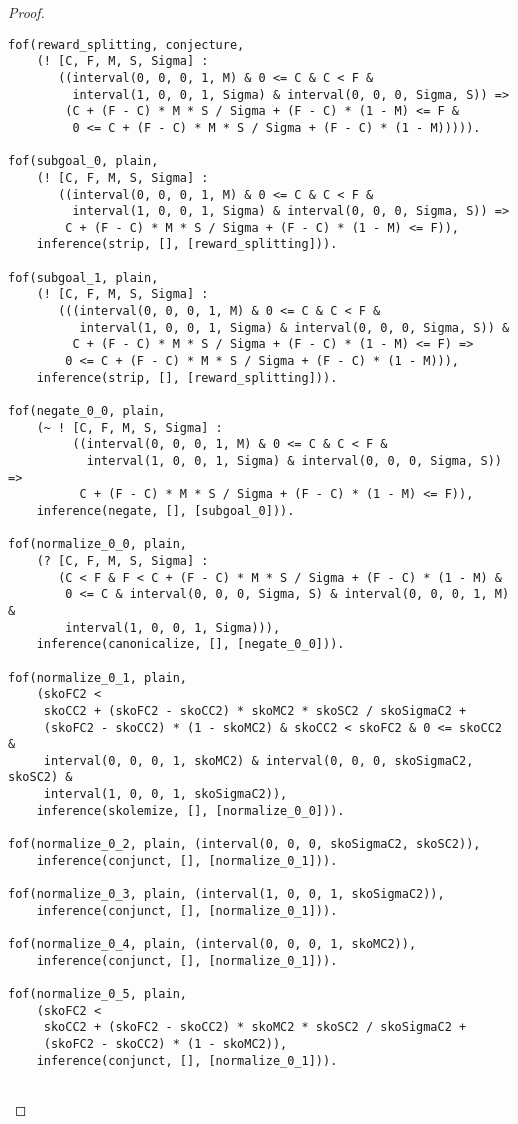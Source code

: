 \begin{proof}
\begin{verbatim}
fof(reward_splitting, conjecture,
    (! [C, F, M, S, Sigma] :
       ((interval(0, 0, 0, 1, M) & 0 <= C & C < F &
         interval(1, 0, 0, 1, Sigma) & interval(0, 0, 0, Sigma, S)) =>
        (C + (F - C) * M * S / Sigma + (F - C) * (1 - M) <= F &
         0 <= C + (F - C) * M * S / Sigma + (F - C) * (1 - M))))).

fof(subgoal_0, plain,
    (! [C, F, M, S, Sigma] :
       ((interval(0, 0, 0, 1, M) & 0 <= C & C < F &
         interval(1, 0, 0, 1, Sigma) & interval(0, 0, 0, Sigma, S)) =>
        C + (F - C) * M * S / Sigma + (F - C) * (1 - M) <= F)),
    inference(strip, [], [reward_splitting])).

fof(subgoal_1, plain,
    (! [C, F, M, S, Sigma] :
       (((interval(0, 0, 0, 1, M) & 0 <= C & C < F &
          interval(1, 0, 0, 1, Sigma) & interval(0, 0, 0, Sigma, S)) &
         C + (F - C) * M * S / Sigma + (F - C) * (1 - M) <= F) =>
        0 <= C + (F - C) * M * S / Sigma + (F - C) * (1 - M))),
    inference(strip, [], [reward_splitting])).

fof(negate_0_0, plain,
    (~ ! [C, F, M, S, Sigma] :
         ((interval(0, 0, 0, 1, M) & 0 <= C & C < F &
           interval(1, 0, 0, 1, Sigma) & interval(0, 0, 0, Sigma, S)) =>
          C + (F - C) * M * S / Sigma + (F - C) * (1 - M) <= F)),
    inference(negate, [], [subgoal_0])).

fof(normalize_0_0, plain,
    (? [C, F, M, S, Sigma] :
       (C < F & F < C + (F - C) * M * S / Sigma + (F - C) * (1 - M) &
        0 <= C & interval(0, 0, 0, Sigma, S) & interval(0, 0, 0, 1, M) &
        interval(1, 0, 0, 1, Sigma))),
    inference(canonicalize, [], [negate_0_0])).

fof(normalize_0_1, plain,
    (skoFC2 <
     skoCC2 + (skoFC2 - skoCC2) * skoMC2 * skoSC2 / skoSigmaC2 +
     (skoFC2 - skoCC2) * (1 - skoMC2) & skoCC2 < skoFC2 & 0 <= skoCC2 &
     interval(0, 0, 0, 1, skoMC2) & interval(0, 0, 0, skoSigmaC2, skoSC2) &
     interval(1, 0, 0, 1, skoSigmaC2)),
    inference(skolemize, [], [normalize_0_0])).

fof(normalize_0_2, plain, (interval(0, 0, 0, skoSigmaC2, skoSC2)),
    inference(conjunct, [], [normalize_0_1])).

fof(normalize_0_3, plain, (interval(1, 0, 0, 1, skoSigmaC2)),
    inference(conjunct, [], [normalize_0_1])).

fof(normalize_0_4, plain, (interval(0, 0, 0, 1, skoMC2)),
    inference(conjunct, [], [normalize_0_1])).

fof(normalize_0_5, plain,
    (skoFC2 <
     skoCC2 + (skoFC2 - skoCC2) * skoMC2 * skoSC2 / skoSigmaC2 +
     (skoFC2 - skoCC2) * (1 - skoMC2)),
    inference(conjunct, [], [normalize_0_1])).


\end{verbatim}
\end{proof}
